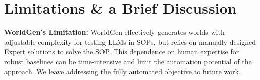 \section{Limitations \& a Brief Discussion}
\textbf{WorldGen's Limitation:}
WorldGen effectively generates worlds with adjustable complexity for testing LLMs in SOPs, but relies on manually designed Expert solutions to solve the SOP. This dependence on human expertise for robust baselines can be time-intensive and limit the automation potential of the approach. We leave addressing the fully automated objective to future work.

